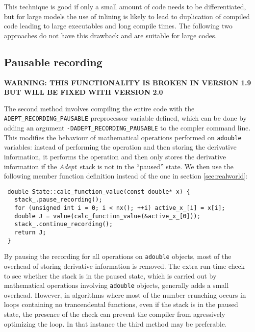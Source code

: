\documentclass[a4,oneside]{book}
\def\codesize{\small}
\def\Adept{\emph{Adept}}
\def\code#1{{\codesize\texttt{#1}}}
\begin{document}
This technique is good if only a small amount of code needs to be
differentiated, but for large models the use of inlining is likely to
lead to duplication of compiled code leading to large executables and
long compile times.  The following two approaches do not have this
drawback and are suitable for large codes.

\subsection{Pausable recording}
\label{sec:pausable}
{\bf WARNING: THIS FUNCTIONALITY IS BROKEN IN VERSION 1.9 BUT WILL BE FIXED WITH VERSION 2.0}

The second method involves compiling the entire code with the
\code{ADEPT\_RECORDING\_PAUSABLE} preprocessor variable defined, which
can be done by adding an argument \code{-DADEPT\_RECORDING\_PAUSABLE}
to the compler command line. This modifies the behaviour of
mathematical operations performed on \code{adouble} variables: instead
of performing the operation and then storing the derivative
information, it performs the operation and then only stores the
derivative information if the \Adept\ stack is not in the ``paused''
state. We then use the following member function definition instead of
the one in section \ref{sec:realworld}:
%
\begin{lstlisting}
 double State::calc_function_value(const double* x) {
   stack_.pause_recording();
   for (unsigned int i = 0; i < nx(); ++i) active_x_[i] = x[i];
   double J = value(calc_function_value(&active_x_[0]));
   stack_.continue_recording();
   return J;
 }
\end{lstlisting}
%
By pausing the recording for all operations on \code{adouble} objects,
most of the overhead of storing derivative information is removed. The
extra run-time check to see whether the stack is in the paused state,
which is carried out by mathematical operations involving
\code{adouble} objects, generally adds a small overhead.  However, in
algorithms where most of the number crunching occurs in loops
containing no trancendental functions, even if the stack is in the
paused state, the presence of the check can prevent the compiler from
agressively optimizing the loop.  In that instance the third method
may be preferable.
%
\end{document}
